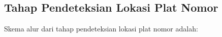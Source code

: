 \begin{adjustbox}{width=1\textwidth}
	\noindent\begin{minipage}{\linewidth}
		\label{fig:ContohCitraDatasetPakai}
	\end{minipage}
\end{adjustbox}

\begin{adjustbox}{width=1\textwidth}
	\noindent\begin{minipage}{\linewidth}
		\label{fig:ContohCitraDatasetTakPakai}
	\end{minipage}
\end{adjustbox}\\


\subsection{Tahap Pendeteksian Lokasi Plat Nomor}
\noindent Skema alur dari tahap pendeteksian lokasi plat nomor adalah:

